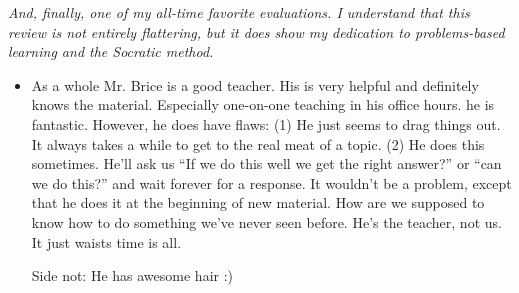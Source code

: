 \documentclass[11pt]{article}
\begin{document}
\emph{And, finally, one of my all-time favorite evaluations.
I understand that this review is not entirely flattering,
but it does show my dedication to problems-based learning
and the Socratic method.}

	\begin{itemize}
		\item{}
      As a whole Mr. Brice is a good teacher.
      His is very helpful and definitely knows the material.
      Especially one-on-one teaching in  his office hours.
      he is fantastic.
      However, he does have flaws:
      (1) He just seems to drag things out.
      It always takes a while to get to the real meat of a topic.
      (2) He does this sometimes.
      He'll ask us ``If we do this well we get the right answer?''
      or ``can we do this?'' and wait forever for a response.
      It wouldn't be a problem, except that he does it at the beginning
      of new material.
      How are we supposed to know how to do something we've never seen
      before.
      He's the teacher, not us.
      It just waists time is all.
		
  		Side not: He has awesome hair :)
	\end{itemize}



\label{page:last}
\end{document}
